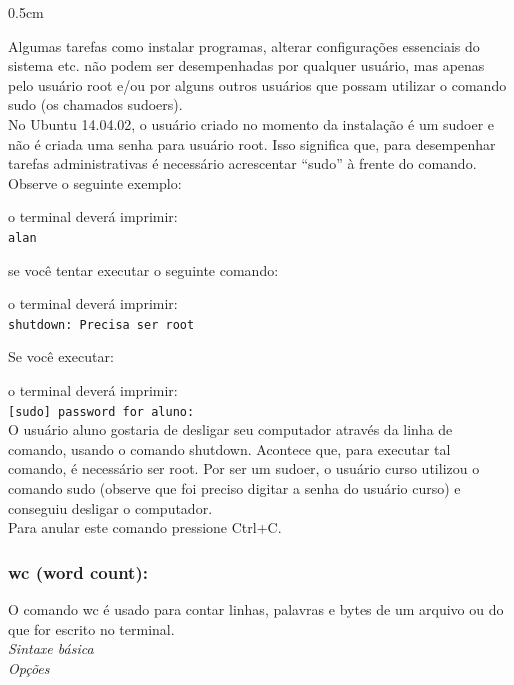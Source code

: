 \begin{refsection}
\begin {myindentpar}{0.5cm}
\begin{enumerate}[\itshape i.]
Algumas tarefas como instalar programas, alterar configurações essenciais do sistema etc. não podem ser desempenhadas por qualquer usuário, mas apenas pelo usuário root e/ou por alguns outros usuários que possam utilizar o comando sudo (os chamados sudoers).\\
No Ubuntu 14.04.02, o usuário criado no momento da instalação é um sudoer e não é criada uma senha para usuário root. Isso significa que, para desempenhar tarefas administrativas é necessário acrescentar ``sudo'' à frente do comando.\\
Observe o seguinte exemplo:\\

o terminal deverá imprimir:\\
\indent\indent\texttt{alan}

se você tentar executar o seguinte comando:\\

o terminal deverá imprimir:\\
\texttt{shutdown: Precisa ser root}

Se você executar:\\

o terminal deverá imprimir:\\
\indent\indent\texttt{[sudo] password for aluno:}\\

O usuário aluno gostaria de desligar seu computador através da linha de comando, usando o comando shutdown. Acontece que, para executar tal comando, é necessário ser root. Por ser um sudoer, o usuário curso utilizou o comando sudo (observe que foi preciso digitar a senha do usuário curso) e conseguiu desligar o computador.\\
Para anular este comando pressione Ctrl+C.\\

\end{enumerate}
\end{myindentpar}


\subsubsection{wc (word count):}\label{tut1:text_mode:commands:wc}

O comando wc é usado para contar linhas, palavras e bytes de um arquivo ou do que for escrito no terminal.\\

\textit{Sintaxe básica}
\\
   \textit{Opções}


\end{refsection}
